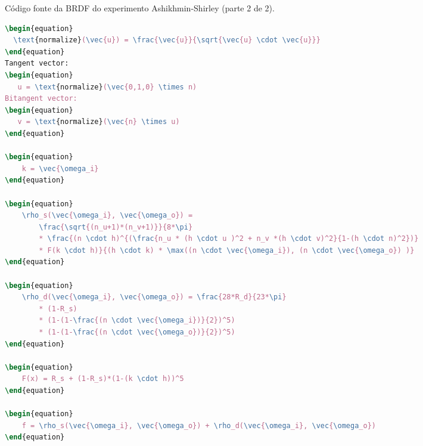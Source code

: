\begin{codigo}[H]
    \caption{\small Código fonte da BRDF do experimento Ashikhmin-Shirley (parte 2 de 2).}
    \label{cod-ashikhmin-shirley-close-to-original-eqlang-pt-2}
\begin{lstlisting}[language=tex, frame=none, inputencoding=utf8]
\begin{equation}
  \text{normalize}(\vec{u}) = \frac{\vec{u}}{\sqrt{\vec{u} \cdot \vec{u}}}
\end{equation}
Tangent vector:
\begin{equation}
   u = \text{normalize}(\vec{0,1,0} \times n)
Bitangent vector:
\begin{equation}
   v = \text{normalize}(\vec{n} \times u)
\end{equation}

\begin{equation}
    k = \vec{\omega_i}
\end{equation}

\begin{equation}
    \rho_s(\vec{\omega_i}, \vec{\omega_o}) =
        \frac{\sqrt{(n_u+1)*(n_v+1)}}{8*\pi}
        * \frac{(n \cdot h)^{(\frac{n_u * (h \cdot u )^2 + n_v *(h \cdot v)^2}{1-(h \cdot n)^2})}
        * F(k \cdot h)}{(h \cdot k) * \max((n \cdot \vec{\omega_i}), (n \cdot \vec{\omega_o}) )}
\end{equation}

\begin{equation}
    \rho_d(\vec{\omega_i}, \vec{\omega_o}) = \frac{28*R_d}{23*\pi}
        * (1-R_s)
        * (1-(1-\frac{(n \cdot \vec{\omega_i})}{2})^5)
        * (1-(1-\frac{(n \cdot \vec{\omega_o})}{2})^5)
\end{equation}

\begin{equation}
    F(x) = R_s + (1-R_s)*(1-(k \cdot h))^5
\end{equation}

\begin{equation}
    f = \rho_s(\vec{\omega_i}, \vec{\omega_o}) + \rho_d(\vec{\omega_i}, \vec{\omega_o})
\end{equation}
\end{lstlisting}
\end{codigo}
